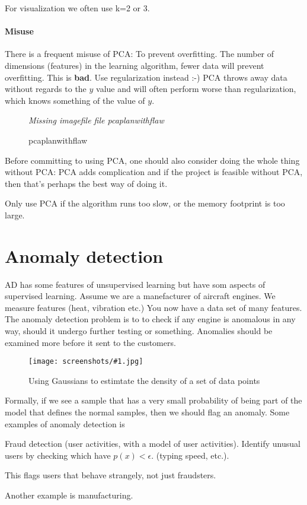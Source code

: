\documentclass[a4, 12pt, english, USenglish]{scrreprt}
\newcommand{\xscreenshot}[2]{
\begin{figure}[htb]
\begin{center}
\em Missing imagefile file #1
\end{center}
\label{#1}
\caption{#2}
\end{figure}}
\newcommand{\screenshot}[2]{
\begin{figure}[htb]
\texttt{[image: screenshots/\#1.jpg]}
\label{#1}
\caption{#2}
\end{figure}}
\begin{document}
For visualization we often use k=2 or 3.

\subsubsection{Misuse}

There is a frequent misuse of PCA: To prevent overfitting.  The number
of dimensions (features) in the learning algorithm, fewer data will
prevent overfitting.    This is {\bf bad}.   Use regularization
instead :-)  PCA throws away data without regards to the \(y\) value
and will often perform worse than regularization, which knows
something of the value of \(y\).


\xscreenshot{pcaplanwithflaw}{pcaplanwithflaw}

Before committing to using PCA, one should also consider doing the
whole thing without PCA:  PCA adds complication and if the project is
feasible without PCA, then that's perhaps the best way of doing it.

Only use PCA if the algorithm runs too slow, or the memory footprint
is too large.

\chapter{Anomaly detection}

AD has some features of unsupervised learning but have som aspects of
supervised learning. Assume we are a manefacturer of aircraft
engines.  We measure features (heat, vibration etc.)  You now have a
data set of many features.  The anomaly detection problem is to to
check if any engine is anomalous in any way, should it undergo further
testing or something.   Anomalies should be examined more before it
sent to the customers.

\screenshot{densityestimation}{Using Gaussians to estimtate the
  density of a set of data points}

Formally, if we see a sample that has a very small probability of
being part of the model that defines the normal samples, then we
should flag an anomaly.  Some examples of anomaly detection is

Fraud detection (user activities, with a model of user activities).
Identify unusual users by checking which have \(p(x)<\epsilon\).
(typing speed, etc.).

This flags users that behave strangely, not just fraudsters.


Another example is manufacturing.  
\end{document}

